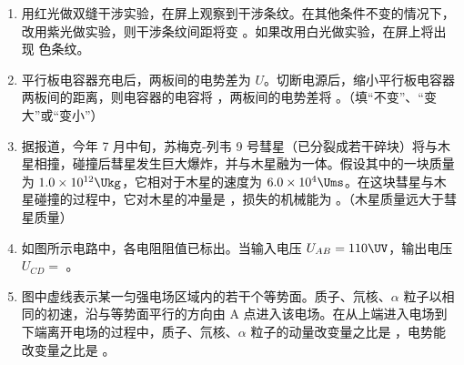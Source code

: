 \documentclass[\gkver]{gaokaozhenti}
\begin{document}
\begin{enumerate}
\item
用红光做双缝干涉实验，在屏上观察到干涉条纹。在其他条件不变的情况下，改用紫光做实验，则干涉条纹间距将变 。如果改用白光做实验，在屏上将出现  色条纹。

\item
平行板电容器充电后，两板间的电势差为 $U$。切断电源后，缩小平行板电容器两板间的距离，则电容器的电容将 ，两板间的电势差将 。（填“不变”、“变大”或“变小”）

\item
据报道，今年 7 月中旬，苏梅克-列韦 9 号彗星（已分裂成若干碎块）将与木星相撞，碰撞后彗星发生巨大爆炸，并与木星融为一体。假设其中的一块质量为 $1.0\times10^{12}\Ukg$，它相对于木星的速度为 $6.0\times10^{4}\Ums$。在这块彗星与木星碰撞的过程中，它对木星的冲量是 ，损失的机械能为 。（木星质量远大于彗星质量）

\item
如图所示电路中，各电阻阻值已标出。当输入电压 $U_{AB} = 110\UV$，输出电压 $U_{CD} =$ \tkanswer[1.6cm]{$1\UV$}。
\onepicture[align=right, w=5cm]{}
\jdanswer{
$1\UV$
}

\item
图中虚线表示某一匀强电场区域内的若干个等势面。质子、氘核、$\alpha$ 粒子以相同的初速，沿与等势面平行的方向由 A 点进入该电场。在从上端进入电场到下端离开电场的过程中，质子、氘核、$\alpha$ 粒子的动量改变量之比是 ，电势能改变量之比是 。
\onepicture[align=right, w=3.5cm]{}


\end{enumerate}
\end{document}
